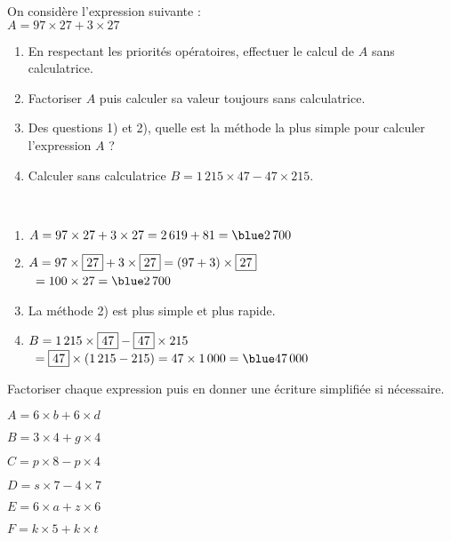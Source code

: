\begin{colonne*exercice}
\bigskip
     
     
\begin{exercice} %
   On considère l'expression suivante : \\
   $A=97\times27+3\times27$
   \begin{enumerate}
      \item En respectant les priorités opératoires, effectuer le calcul de $A$ sans  calculatrice.
      \item Factoriser $A$ puis calculer sa valeur toujours sans calculatrice.
      \item Des questions 1) et 2), quelle est la méthode la plus simple pour calculer l'expression $A$ ?
      \item Calculer sans calculatrice $B =1\,215\times47-47\times215$.
   \end{enumerate}
\end{exercice}  

\begin{corrige}
   \ \\ [-5mm]
   \begin{enumerate}
      \item $A=97\times27+3\times27 =2\,619+81 =\blue2\,700$ \smallskip
      \item $A=97\times\fbox{27}+3\times\fbox{27} =(97+3)\times\fbox{27}$ \\
         \quad\, $=100\times27 =\blue2\,700$ \smallskip
      \item La {\blue méthode 2)} est plus simple et plus rapide. \smallskip
      \item $B =1\,215\times\fbox{47}-\fbox{47}\times215$ \\
         \quad\, $=\fbox{47}\times(1\,215-215) =47\times1\,000 =\blue 47\,000$
   \end{enumerate}
\end{corrige}  

\bigskip


\begin{exercice} %
   Factoriser chaque expression puis en donner une écriture simplifiée si nécessaire.
   \begin{colenumerate}{2}
      \item $A =6\times b+6\times d$
      \item $B =3\times4+g\times4$
      \item $C =p\times8-p\times4$
      \item $D =s\times7-4\times7$
      \item $E =6\times a+z\times 6$
      \item $F =k\times5+k\times t$ 
   \end{colenumerate}
\end{exercice}


\end{colonne*exercice}
